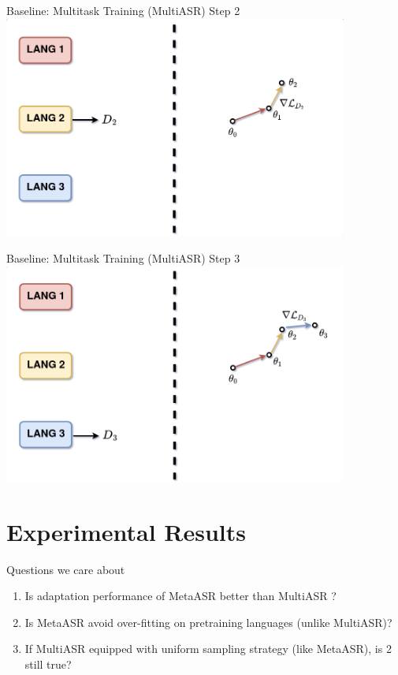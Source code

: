 \documentclass{beamer}
\begin{document}
\begin{frame}[t]{Baseline: Multitask Training (MultiASR)}
  Step 2 
  \center \includegraphics[width=0.85\textwidth]{fig/multi_step2.png}
\end{frame}

\begin{frame}[t]{Baseline: Multitask Training (MultiASR)}
  Step 3 
  \center \includegraphics[width=0.85\textwidth]{fig/multi_step3.png}
\end{frame}

\section{Experimental Results}
\begin{frame}[t]{Questions we care about}
  \begin{enumerate}
    \item Is adaptation performance of MetaASR better than MultiASR ?
    \item Is MetaASR avoid over-fitting on pretraining languages (unlike MultiASR)?
    \item If MultiASR equipped with uniform sampling strategy (like MetaASR), is 2 still true?
  \end{enumerate}
\end{frame}
\end{document}
